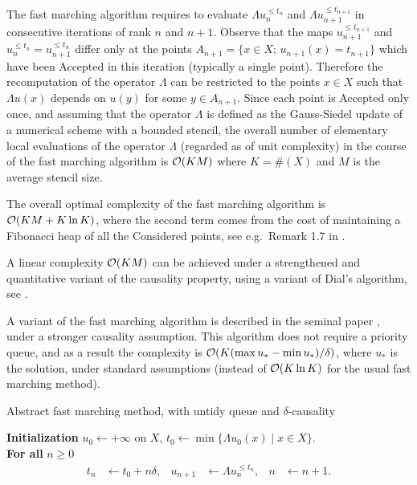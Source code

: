 \begin{remark}
The fast marching algorithm requires to evaluate $\Lambda u_n^{\leq t_n}$ and $\Lambda u_{n+1}^{\leq t_{n+1}}$ in consecutive iterations of rank $n$ and $n+1$.
Observe that  the maps $u_{n+1}^{\leq t_{n+1}}$ and $u_n^{\leq t_n} = u_{n+1}^{\leq t_n}$ 
differ only at the points $A_{n+1} = \{x\in X;\, u_{n+1}(x)=t_{n+1}\}$ which have been Accepted in this iteration (typically a single point).
Therefore the recomputation of the operator $\Lambda$ can be restricted to the points $x \in X$ such that $\Lambda u(x)$ depends on $u(y)$ for some $y \in A_{n+1}$.
Since each point is Accepted only once, and assuming that the operator $\Lambda$ is defined as the Gauss-Siedel update of a numerical scheme with a bounded stencil, the overall number of elementary local evaluations of the operator $\Lambda$ (regarded as of unit complexity) in the course of the fast marching algorithm is $\mathcal{O}(K M)$ where $K = \#(X)$ and $M$ is the average stencil size.

The overall optimal complexity of the fast marching algorithm is $\mathcal{O}(K M + K \ln K)$, where the second term comes from the cost of maintaining a Fibonacci heap of all the Considered points, see e.g.\ Remark 1.7 in \cite{Mirebeau:2014EfficientFinsler}.

A linear complexity $\mathcal{O}(KM)$ can be achieved under a strengthened and quantitative variant of the causality property, using a variant of Dial's algorithm, see \cite{Tsitsiklis:1995gh,Vladimirsky:2008LabelSetting}.
\end{remark}


A variant of the fast marching algorithm is described in the seminal paper \cite{Tsitsiklis:1995EfficientTrajectories}, under a stronger causality assumption. This algorithm does not require a priority queue, and as a result the complexity is $\mathcal{O}(K (\max u_* - \min u_*)/\delta)$, where $u_*$ is the solution, under standard assumptions (instead of $\mathcal{O}(K \ln K)$ for the usual fast marching method). 

\begin{algorithm}
\caption{Abstract fast marching method, with untidy queue and $\delta$-causality}
\label{algo:FastMarching2}
\textbf{Initialization } $u_0 \gets +\infty$ on $X$, $t_0 \gets \min\{\Lambda u_0(x)\mid x \in X\}$.\\
\textbf{For all} $n \geq 0$
\begin{align*}
	t_n &\gets t_0 + n \delta, &
	u_{n+1} & \gets \Lambda u_n^{\leq t_n}, &
	n &\gets n+1.
\end{align*}
\end{algorithm}


